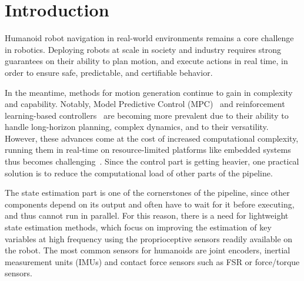 \documentclass[10pt,twocolumn]{ICCAS}
\begin{document}

\maketitle


\section{Introduction}

Humanoid robot navigation in real-world environments remains a core challenge in robotics. Deploying robots at scale in society and industry requires strong guarantees on their ability to plan motion, and execute actions in real time, in order to ensure safe, predictable, and certifiable behavior.

In the meantime, methods for motion generation continue to gain in complexity and capability. Notably, Model Predictive Control (MPC)~\cite{Dallard2024AdiosStabilizers} and reinforcement learning-based controllers~\cite{Peters2003ReinforcmentLearningForHumanoid} are becoming more prevalent due to their ability to handle long-horizon planning, complex dynamics, and to their versatility. However, these advances come at the cost of increased computational complexity, running them in real-time on resource-limited platforms like embedded systems thus becomes challenging~\cite{findeisen2004computationalDelayNMPC}. Since the control part is getting heavier, one practical solution is to reduce the computational load of other parts of the pipeline. 

The state estimation part is one of the cornerstones of the pipeline, since other components depend on its output and often have to wait for it before executing, and thus cannot run in parallel. For this reason, there is a need for lightweight state estimation methods, which focus on improving the estimation of key variables at high frequency using the proprioceptive sensors readily available on the robot. The most common sensors for humanoids are joint encoders, inertial measurement units (IMUs) and contact force sensors such as FSR or force/torque sensors.
\end{document}
